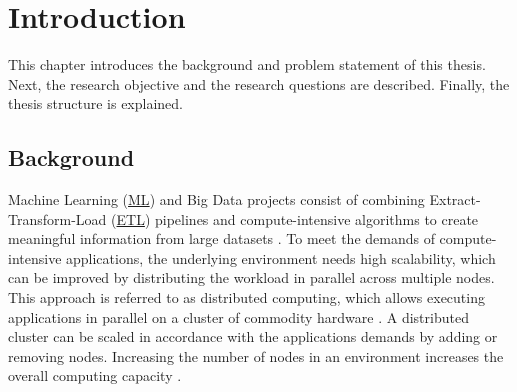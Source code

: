 \chapter{Introduction}
\label{chap:01_introduction}

This chapter introduces the background and problem statement of this thesis.
Next, the research objective and the research questions are described.
Finally, the thesis structure is explained.


\section{Background}
Machine Learning (\hyperlink{abbr:ml}{ML}) and Big Data projects consist of combining Extract-Transform-Load (\hyperlink{abbr:etl}{ETL}) pipelines and compute-intensive algorithms to create meaningful information from large datasets \cite{Vadapalli2018DevOps}.
To meet the demands of compute-intensive applications, the underlying environment needs high scalability, which can be improved by distributing the workload in parallel across multiple nodes.
This approach is referred to as distributed computing, which allows executing applications in parallel on a cluster of commodity hardware \cite{Ganelin2016Spark}. A distributed cluster can be scaled in accordance with the applications demands by adding or removing nodes. Increasing the number of nodes in an environment increases the overall computing capacity \cite{Wilder2012CloudPatterns, Abbott2015ScalabilityArt}.


